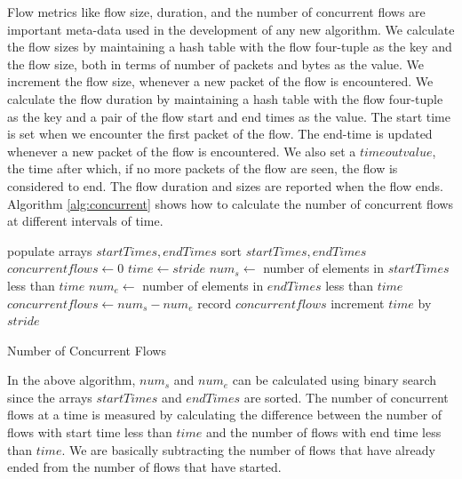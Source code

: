 Flow metrics like flow size, duration, and the number of concurrent flows are important meta-data used in the development of any new algorithm. We calculate the flow sizes by maintaining a hash table with the flow four-tuple as the key and the flow size, both in terms of number of packets and bytes as the value. We increment the flow size, whenever a new packet of the flow is encountered. We calculate the flow duration by maintaining a hash table with the flow four-tuple as the key and a pair of the flow start and end times as the value. The start time is set when we encounter the first packet of the flow. The end-time is updated whenever a new packet of the flow is encountered. We also set a $timeout value$, the time after which, if no more packets of the flow are seen, the flow is considered to end. The flow duration and sizes are reported when the flow ends. Algorithm \ref{alg:concurrent} shows how to calculate the number of concurrent flows at different intervals of time.

\begin{algorithm}[ttpb]
\bigskip
\begin{algorithmic}
\State populate arrays $startTimes,endTimes$ 
\State sort $startTimes,endTimes$
\State $concurrentflows \gets 0$
\State $time \gets stride$
\State $num_s \gets $ number of elements in $startTimes$ less than $time$
\State $num_e \gets $ number of elements in $endTimes$ less than $time$
\State $concurrentflows \gets num_s - num_e$
\State record $concurrentflows$
\State increment $time$ by $stride$
\EndWhile
\end{algorithmic}
\caption[Number of Concurrent Flows]{Number of Concurrent Flows}
\label{alg:concurrent}
\bigskip
\end{algorithm}

In the above algorithm, $num_s$ and $num_e$ can be calculated using binary search since the arrays $startTimes$ and $endTimes$ are sorted. The number of concurrent flows at a time is measured by calculating the difference between the number of flows with start time less than $time$ and the number of flows with end time less than $time$. We are basically subtracting the number of flows that have already ended from the number of flows that have started.




